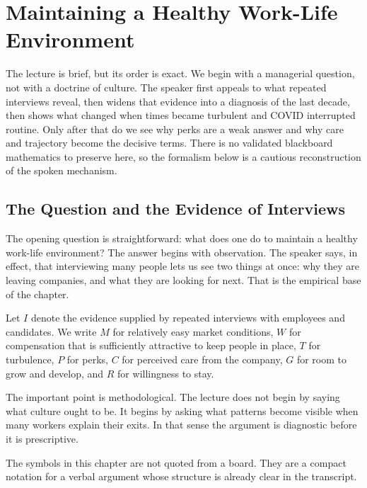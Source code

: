 \chapter{Maintaining a Healthy Work-Life Environment}

The lecture is brief, but its order is exact. We begin with a managerial question, not with a doctrine of culture. The speaker first appeals to what repeated interviews reveal, then widens that evidence into a diagnosis of the last decade, then shows what changed when times became turbulent and COVID interrupted routine. Only after that do we see why perks are a weak answer and why care and trajectory become the decisive terms. There is no validated blackboard mathematics to preserve here, so the formalism below is a cautious reconstruction of the spoken mechanism.

\section{The Question and the Evidence of Interviews}

The opening question is straightforward: what does one do to maintain a healthy work-life environment? The answer begins with observation. The speaker says, in effect, that interviewing many people lets us see two things at once: why they are leaving companies, and what they are looking for next. That is the empirical base of the chapter.

\begin{definition}
Let \(I\) denote the evidence supplied by repeated interviews with employees and candidates. We write \(M\) for relatively easy market conditions, \(W\) for compensation that is sufficiently attractive to keep people in place, \(T\) for turbulence, \(P\) for perks, \(C\) for perceived care from the company, \(G\) for room to grow and develop, and \(R\) for willingness to stay.
\end{definition}

The important point is methodological. The lecture does not begin by saying what culture ought to be. It begins by asking what patterns become visible when many workers explain their exits. In that sense the argument is diagnostic before it is prescriptive.

\begin{remark}
The symbols in this chapter are not quoted from a board. They are a compact notation for a verbal argument whose structure is already clear in the transcript.
\end{remark}

